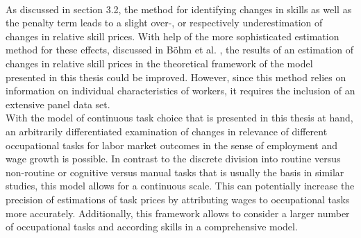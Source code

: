 \documentclass[../main.tex]{subfiles}
\begin{document}
\\
As discussed in section 3.2, the method for identifying changes in skills as well as the penalty term leads to a slight over-, or respectively underestimation of changes in relative skill prices. With help of the more sophisticated estimation method for these effects, discussed in Böhm et al. \citeyear{bohm2019occupation}, the results of an estimation of changes in relative skill prices in the theoretical framework of the model presented in this thesis could be improved. However, since this method relies on information on individual characteristics of workers, it requires the inclusion of an extensive panel data set.
\\
With the model of continuous task choice that is presented in this thesis at hand, an arbitrarily differentiated examination of changes in relevance of different occupational tasks for labor market outcomes in the sense of employment and wage growth is possible. In contrast to the discrete division into routine versus non-routine or cognitive versus manual tasks that is usually the basis in similar studies, this model allows for a continuous scale. This can potentially increase the precision of estimations of task prices by attributing wages to occupational tasks more accurately. Additionally, this framework allows to consider a larger number of occupational tasks and according skills in a comprehensive model.
\end{document}
